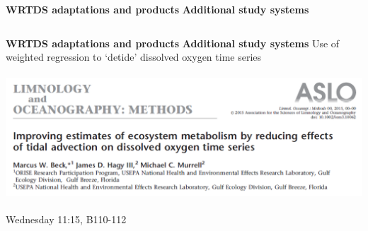 \documentclass[serif]{beamer}\usepackage[]{graphicx}\usepackage[]{color}
\begin{document}
\begin{frame}{\textbf{WRTDS adaptations and products}}{\textbf{ Additional study systems}}
\begin{columns}
\begin{column}{0.65\textwidth}
\end{column}
\end{columns}
\end{frame}

\begin{frame}{\textbf{WRTDS adaptations and products}}{\textbf{ Additional study systems}}
Use of weighted regression to `detide' dissolved oxygen time series \\~\\
\includegraphics[width = \textwidth]{fig/lopaper.png} \\~\\
\alert{Wednesday 11:15, B110-112}
\end{frame}
\end{document}
